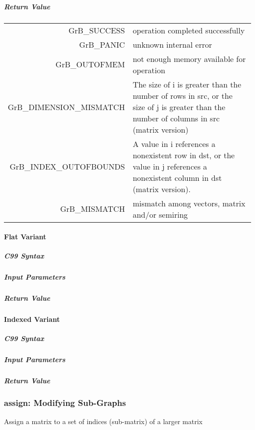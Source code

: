 \subparagraph{Return Value}


\begin{tabular}{rl} 
{\sf GrB\_SUCCESS} 	& operation completed successfully \\
{\sf GrB\_PANIC}	& unknown internal error \\
{\sf GrB\_OUTOFMEM}	& not enough memory available for operation \\
{\sf GrB\_DIMENSION\_MISMATCH} & 
       The size of i is greater than the number of rows in src, or
       the size of j is greater than the number of columns in src (matrix version) \\
{\sf GrB\_INDEX\_OUTOFBOUNDS} &
       A value in i references a nonexistent row in dst, or
	   the value in j references a nonexistent column in dst (matrix version).\\
{\sf GrB\_MISMATCH} & 
	   mismatch among vectors, matrix and/or semiring
\end{tabular}


\paragraph{Flat Variant}
\subparagraph{C99 Syntax}
\subparagraph{Input Parameters}
\subparagraph{Return Value}

\paragraph{Indexed Variant}
\subparagraph{C99 Syntax}
\subparagraph{Input Parameters}
\subparagraph{Return Value}

\subsubsection{{\sf assign}: Modifying Sub-Graphs}

Assign a matrix to a set of indices (sub-matrix) of a larger matrix


